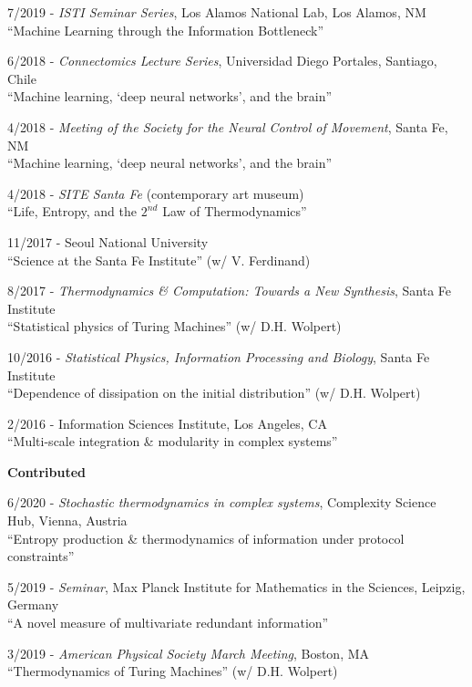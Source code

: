 \documentclass[margin,line,centered]{res}
\begin{document}
\begin{resume}
7/2019 - \emph{ISTI Seminar Series}, Los Alamos National Lab, Los Alamos, NM\\
``Machine Learning through the Information Bottleneck''  %


6/2018 - \emph{Connectomics Lecture Series}, Universidad Diego Portales, Santiago, Chile\\
``Machine learning, `deep neural networks', and the brain''  %

4/2018 - \emph{Meeting of the Society for the Neural Control of Movement}, Santa Fe, NM\\
``Machine learning, `deep neural networks', and the brain''

4/2018 - \emph{SITE Santa Fe} (contemporary art museum)\\
``Life, Entropy, and the $2^{{nd}}$ Law of Thermodynamics''

11/2017 - Seoul National University\\
``Science at the Santa Fe Institute'' (w/ V. Ferdinand) %

8/2017 - \emph{Thermodynamics \& Computation: Towards a New Synthesis}, Santa Fe Institute\\
``Statistical physics of Turing Machines'' (w/ D.H. Wolpert) %

10/2016 - \emph{Statistical Physics, Information Processing and Biology}, Santa Fe Institute \\
``Dependence of dissipation on the initial distribution'' (w/ D.H. Wolpert) %

2/2016 - Information Sciences Institute, Los Angeles, CA\\
``Multi-scale integration \& modularity in complex systems'' %


\vspace{5pt}

\textbf{Contributed}

6/2020 - \emph{Stochastic thermodynamics in complex systems}, Complexity Science Hub, Vienna, Austria\\
``Entropy production \& thermodynamics of information under protocol constraints''

5/2019 - \emph{Seminar}, Max Planck Institute for Mathematics in the Sciences, Leipzig, Germany\\
``A novel measure of multivariate redundant information''

3/2019 - \emph{American Physical Society March Meeting}, Boston, MA\\
``Thermodynamics of Turing Machines'' (w/ D.H. Wolpert)%


\end{resume}
\end{document}
